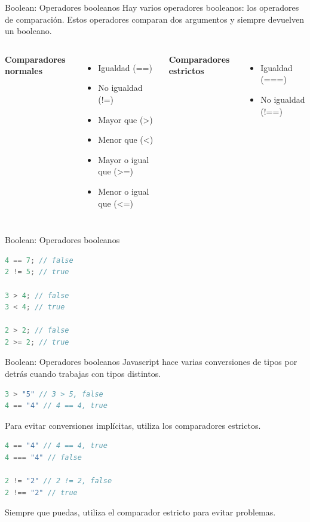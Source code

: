\documentclass{beamer}
\begin{document}
\begin{frame}{Boolean: Operadores booleanos}
Hay varios operadores booleanos: los operadores de comparación. Estos operadores comparan dos argumentos y siempre devuelven un booleano. \bigskip

\begin{columns}[t, onlytextwidth]
                \textbf{Comparadores normales}
                \begin{itemize}
                    \item Igualdad (==)
                    \item No igualdad (!=)
                    \item Mayor que (>)
                    \item Menor que (<)
                    \item Mayor o igual que (>=)
                    \item Menor o igual que (<=)
                \end{itemize}
            
                \textbf{Comparadores estrictos}
                \begin{itemize}
                    \item Igualdad (===)
                    \item No igualdad (!==)
                \end{itemize}
        \end{columns}
\end{frame}

\begin{frame}[fragile]{Boolean: Operadores booleanos}
\begin{lstlisting}[language=JavaScript]
4 == 7; // false
2 != 5; // true

3 > 4; // false
3 < 4; // true

2 > 2; // false
2 >= 2; // true
\end{lstlisting}
\end{frame}

\begin{frame}[fragile]{Boolean: Operadores booleanos}
Javascript hace varias conversiones de tipos por detrás cuando trabajas con tipos distintos.
\begin{lstlisting}[language=JavaScript]
3 > "5" // 3 > 5, false
4 == "4" // 4 == 4, true
\end{lstlisting}

Para evitar conversiones implícitas, utiliza los comparadores estrictos.
\begin{lstlisting}[language=JavaScript]
4 == "4" // 4 == 4, true
4 === "4" // false

2 != "2" // 2 != 2, false
2 !== "2" // true
\end{lstlisting}
Siempre que puedas, utiliza el comparador estricto para evitar problemas.


\end{frame}
\end{document}
